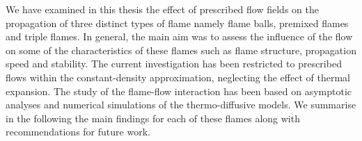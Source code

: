 We have examined in this thesis the effect of prescribed flow fields on the propagation of three distinct types of flame namely flame balls, premixed flames and triple flames. In general, the main aim was to assess the influence of the flow on some of the characteristics of these flames such as flame structure, propagation speed and stability. The current investigation has been restricted to prescribed flows within the constant-density approximation, neglecting the effect of thermal expansion. The study of the flame-flow interaction has been based on asymptotic analyses and numerical simulations of the thermo-diffusive models. We summarise in the following the main findings for each of these flames along with recommendations for future work.
